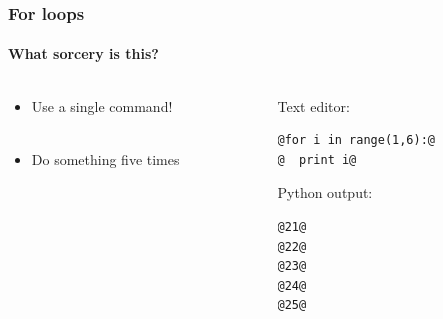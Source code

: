 \documentclass[handout]{beamer}
\begin{document}
\begin{frame}[fragile]
\frametitle{For loops}
\framesubtitle{What sorcery is this?}
\large
  \begin{columns}[T]
    \begin{column}{.5\textwidth} 


\begin{itemize}

 \item Use a single command! \\ \

\item{Do something five times}





\end{itemize}
     \end{column}
     
         \begin{column}{.5\textwidth} 
         Text editor:
\begin{lstlisting}[style=base]
@for i in range(1,6):@
@  print i@

\end{lstlisting}

\vfill

Python output:
\begin{lstlisting}[style=base]
@21@
@22@
@23@
@24@
@25@


\end{lstlisting}

    \end{column}
    \end{columns}

\end{frame}
\end{document}

